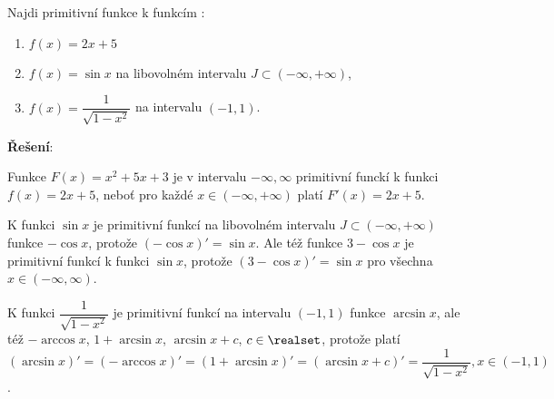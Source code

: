 \begin{mdframed}[style=mdexam]
  \begin{example}\label{mai:exam118}
    Najdi primitivní funkce k funkcím \cite[s.~254]{Brabec1989}:
    \begin{enumerate}
      \item \(f(x) = 2x+5\)
      \item \(f(x) = \sin x\) na libovolném intervalu \(J\subset(-\infty,+\infty)\),
      \item \(f(x) = \dfrac{1}{\sqrt{1-x^2}}\) na intervalu \((-1, 1)\).
    \end{enumerate}
    \vspace{1em}
    \textbf{Řešení}:\newline

    Funkce \(F(x) = x^2+5x+3\) je v intervalu \(-\infty, \infty\) primitivní funckí k funkci \(f(x)
    = 2x+5\), neboť pro každé \(x\in(-\infty,+\infty)\) platí \(F'(x)=2x+5\).

    K funkci \(\sin x\) je primitivní funkcí na libovolném intervalu \(J\subset(-\infty,+\infty)\) 
    funkce \(-\cos x\), protože \((-\cos x)' = \sin x\). Ale též funkce \(3-\cos x\) je primitivní 
    funkcí k funkci \(\sin x\), protože \((3 - \cos x)' = \sin x\) pro všechna \(x\in(-\infty, 
    \infty)\).

    K funkci  \(\dfrac{1}{\sqrt{1-x^2}}\) je primitivní funkcí na intervalu \((-1, 1)\) funkce
    \(\arcsin x\), ale též \(-\arccos x\), \(1 + \arcsin x\), \(\arcsin x + c\), \(c\in\realset\),
    protože platí \((\arcsin x)' = (-\arccos x)' = (1+\arcsin x)' = (\arcsin x + c)' =
    \dfrac{1}{\sqrt{1-x^2}}, x\in(-1, 1)\).
  \end{example}
\end{mdframed}